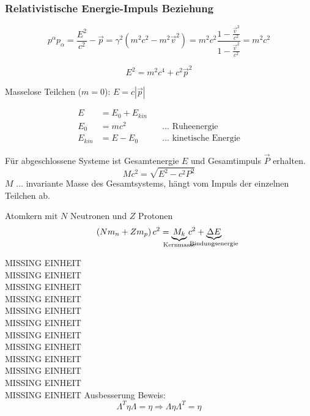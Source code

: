 \documentclass[a4paper, 11pt]{article}
\numberwithin{equation}{section}
\newcommand{\ubtext}[2]{\underbrace{#1}_{\mathclap{\text{#2}}}}
\begin{document}
\subsubsection*{Relativistische Energie-Impuls Beziehung}
\begin{equation*}
p^\alpha p_\alpha = \dfrac{E^2}{c^2} - \vec{p} = \gamma^2 \left( m^2 c^2 - m^2 \vec{v}^2 \right) = m^2 c^2 \dfrac{1- \frac{\vec{v}^2}{c^2}}{1- \frac{\vec{v}^2}{c^2}} = m^2 c^2
\end{equation*}

\begin{equation}
\boxed{E^2 = m^2c^4 + c^2 \vec{p}^2}
\end{equation}

Masselose Teilchen ($m=0$): $E = c |\vec{p}|$

\begin{equation}
\begin{aligned}
E &= E_0 + E_{kin} \\
E_0 &= mc^2 \qquad &... \text{ Ruheenergie}\\
E_{kin} &= E -E_0 \qquad &... \text{ kinetische Energie}
\end{aligned}
\end{equation}

Für abgeschlossene Systeme ist Gesamtenergie $E$ und Gesamtimpuls $\vec{P}$ erhalten.
\begin{equation}
M c^2 = \sqrt{E^2 -c^2P^2}
\end{equation}
$M$ $...$ invariante Masse des Gesamtsystems, hängt vom Impuls der einzelnen Teilchen ab.

Atomkern mit $N$ Neutronen und $Z$ Protonen
\begin{equation}
\left( N m_n + Z m_p \right) c^2 = \ubtext{M_k}{Kernmasse} c^2 + \ubtext{\Delta E}{Bindungsenergie}
\end{equation}


MISSING EINHEIT \\
MISSING EINHEIT \\
MISSING EINHEIT \\
MISSING EINHEIT \\
MISSING EINHEIT \\
MISSING EINHEIT \\
MISSING EINHEIT \\
MISSING EINHEIT \\
MISSING EINHEIT \\
MISSING EINHEIT \\
MISSING EINHEIT \\
MISSING EINHEIT
Ausbesserung Beweis:
\begin{equation*}
\Lambda^T \eta \Lambda = \eta  \Rightarrow \Lambda \eta \Lambda^T = \eta
\end{equation*}
\end{document}
